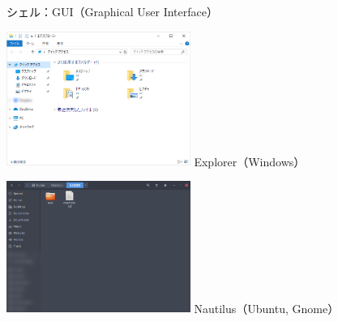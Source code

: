 \documentclass[12pt,aspectratio=169]{beamer}
\begin{document}
\begin{frame}{シェル：GUI（Graphical User Interface）}

  \begin{minipage}{0.45\textwidth}
    \includegraphics[width=6cm,bb=0 0 659 481]{./images/explorer.png}
    Explorer（Windows）
  \end{minipage}
  \hfill
  \begin{minipage}{0.45\textwidth}
    \includegraphics[width=6cm,bb=0 0 892 640]{./images/nautilus.png}
    Nautilus（Ubuntu, Gnome）
  \end{minipage}

\end{frame}
\end{document}

